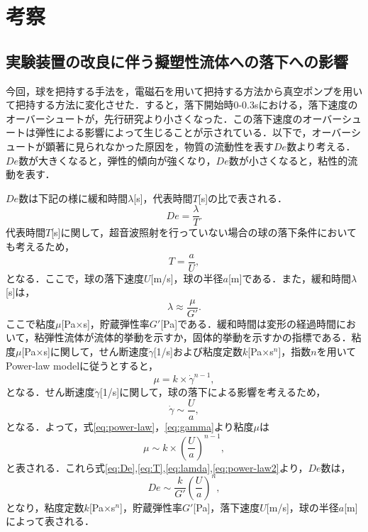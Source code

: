 \section{考察}

\subsection{実験装置の改良に伴う擬塑性流体への落下への影響}
\label{sec:dis-de}

今回，球を把持する手法を，電磁石を用いて把持する方法から真空ポンプを用いて把持する方法に変化させた．すると，落下開始時0-0.3sにおける，落下速度のオーバーシュートが，先行研究より小さくなった．この落下速度のオーバーシュートは弾性による影響によって生じることが示されている\cite{ref:12}．以下で，オーバーシュートが顕著に見られなかった原因を，物質の流動性を表す$De$数より考える．$De$数が大きくなると，弾性的傾向が強くなり，$De$数が小さくなると，粘性的流動を表す．

$De$数は下記の様に緩和時間$\lambda$[s]，代表時間$T$[s]の比で表される．
\begin{equation}
    De = \frac{\lambda}{T} .
    \label{eq:De}
\end{equation}
代表時間$T$[s]に関して，超音波照射を行っていない場合の球の落下条件においても考えるため，
\begin{equation}
    T = \frac{a}{U} ,
    \label{eq:T}
\end{equation}
となる．ここで，球の落下速度$U$[m/s]，球の半径$a$[m]である．また，緩和時間$\lambda$[s]は，
\begin{equation}
    \lambda \approx \frac{\mu}{G'} .
    \label{eq:lamda}
\end{equation}
ここで粘度$\mu$[Pa$\times$s]，貯蔵弾性率$G'$[Pa]である．緩和時間は変形の経過時間において，粘弾性流体が流体的挙動を示すか，固体的挙動を示すかの指標である\cite{ref:sakanishi}．粘度$\mu$[Pa$\times$s]に関して，せん断速度$\dot{\gamma}$[1/s]および粘度定数$k$[Pa$\times$s${}^n$]，指数$n$を用いてPower-law modelに従うとすると，
\begin{equation}
    \mu = k \times \dot{\gamma}^{n-1} ,
    \label{eq:power-law}
\end{equation}
となる．せん断速度$\dot{\gamma}$[1/s]に関して，球の落下による影響を考えるため，
\begin{equation}
    \dot{\gamma} \sim \frac{U}{a} ,
    \label{eq:gamma}
\end{equation}
となる．よって，式\ref{eq:power-law}，\ref{eq:gamma}より粘度$\mu$は
\begin{equation}
    \mu \sim k \times \left(\frac{U}{a}\right)^{n-1} ,
    \label{eq:power-law2}
\end{equation}
と表される．これら式\ref{eq:De},\ref{eq:T},\ref{eq:lamda},\ref{eq:power-law2}より，$De$数は，
\begin{equation}
    De \sim \frac{k}{G'} {\left(\frac{U}{a}\right)}^n ,
    \label{eq:De2}
\end{equation}
となり，粘度定数$k$[Pa$\times$s${}^n$]，貯蔵弾性率$G'$[Pa]，落下速度$U$[m/s]，球の半径$a$[m]によって表される．

